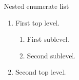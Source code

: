 \documentclass[14pt,t]{beamer}
\begin{document}
\begin{frame}{Nested enumerate list}
\begin{enumerate}
\item First top level.
  \begin{enumerate}
  \item First sublevel.
  \item Second sublevel.
  \end{enumerate}
\item Second top level.
\end{enumerate}
\end{frame}
\end{document}
